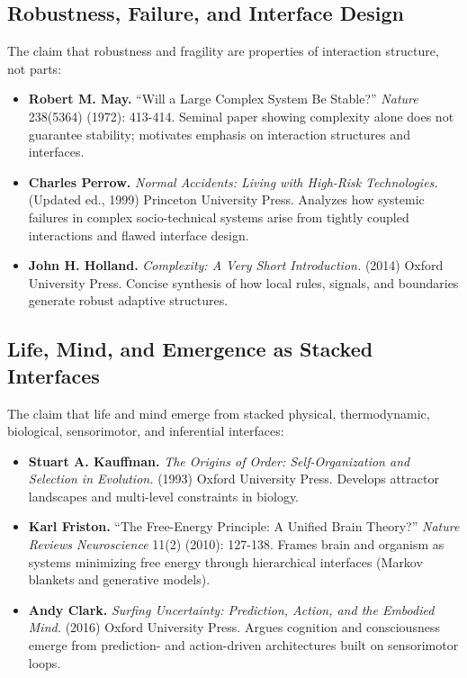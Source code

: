 \documentclass[
  openright]{book}
\begin{document}
\subsection{Robustness, Failure, and Interface
Design}\label{robustness-failure-and-interface-design}

The claim that robustness and fragility are properties of interaction
structure, not parts:

\begin{itemize}
\item
  \textbf{Robert M. May.} ``Will a Large Complex System Be Stable?''
  \emph{Nature} 238(5364) (1972): 413-414. Seminal paper showing
  complexity alone does not guarantee stability; motivates emphasis on
  interaction structures and interfaces.
\item
  \textbf{Charles Perrow.} \emph{Normal Accidents: Living with High-Risk
  Technologies.} (Updated ed., 1999) Princeton University Press.
  Analyzes how systemic failures in complex socio-technical systems
  arise from tightly coupled interactions and flawed interface design.
\item
  \textbf{John H. Holland.} \emph{Complexity: A Very Short
  Introduction.} (2014) Oxford University Press. Concise synthesis of
  how local rules, signals, and boundaries generate robust adaptive
  structures.
\end{itemize}

\subsection{Life, Mind, and Emergence as Stacked
Interfaces}\label{life-mind-and-emergence-as-stacked-interfaces}

The claim that life and mind emerge from stacked physical,
thermodynamic, biological, sensorimotor, and inferential interfaces:

\begin{itemize}
\item
  \textbf{Stuart A. Kauffman.} \emph{The Origins of Order:
  Self-Organization and Selection in Evolution.} (1993) Oxford
  University Press. Develops attractor landscapes and multi-level
  constraints in biology.
\item
  \textbf{Karl Friston.} ``The Free-Energy Principle: A Unified Brain
  Theory?'' \emph{Nature Reviews Neuroscience} 11(2) (2010): 127-138.
  Frames brain and organism as systems minimizing free energy through
  hierarchical interfaces (Markov blankets and generative models).
\item
  \textbf{Andy Clark.} \emph{Surfing Uncertainty: Prediction, Action,
  and the Embodied Mind.} (2016) Oxford University Press. Argues
  cognition and consciousness emerge from prediction- and action-driven
  architectures built on sensorimotor loops.
\end{itemize}
\end{document}
